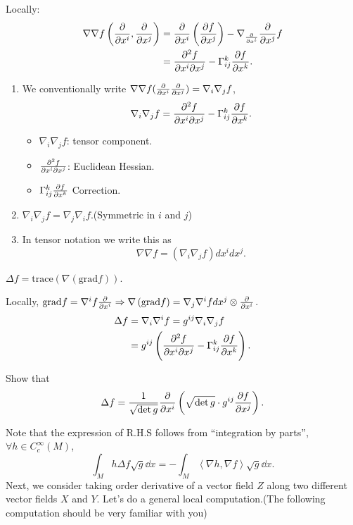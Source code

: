  Locally: 
 \begin{align*}
    \nabla\nabla f\left(\pdv{x^i},\pdv{x^j}\right)&=
    \pdv{x^i}\left(\pdv{f}{x^j}\right)-\nabla_{\pdv{x^i}}\pdv{x^j} f\\
    &=\pdv{f}{x^i}{x^j}-\Gamma\indices*{_{ij}^k}\pdv{f}{x^k}.
 \end{align*}
 \begin{remark}
    \begin{enumerate}[(1)]
        \item We conventionally write \(\nabla\nabla f(\pdv{x^i}
        \pdv{x^j})=\nabla_i\nabla_j f\), \ie\ 
        \[
            \nabla_i\nabla_j f=
            \pdv{f}{x^i}{x^j}-\Gamma\indices*{_{ij}^k}\pdv{f}{x^k}.   
        \]
        \begin{itemize}
            \item \(\nabla_i\nabla_j f\): tensor component.
            \item \(\pdv{f}{x^i}{x^j}\): Euclidean Hessian.
            \item \(\Gamma\indices*{_{ij}^k}\pdv{f}{x^k}\)
            Correction.
        \end{itemize}
        \item \(\nabla_i\nabla_j f=\nabla_j\nabla_i f\).(Symmetric in 
        \(i\) and \(j\))
        \item In tensor notation we write this as 
        \[
            \nabla\nabla f=\left(\nabla_i\nabla_j f\right)d x^i d x^j.    
        \]
    \end{enumerate}
 \end{remark}
 \begin{definition}[Laplacian of \(f\)]
    \(\Delta f=\mathrm{trace}\left(\nabla\left(\mathrm{grad}
    f\right)\right)\).
 \end{definition}
 Locally, \(\mathrm{grad} f=\nabla^i f\pdv{x^i}\Rightarrow
 \nabla\left(\mathrm{grad}f\right)=\nabla_j\nabla^i f dx^j\otimes
  \pdv{x^i}\).
  \begin{align*}
    \Delta f & =\nabla_i \nabla^i f=g^{ij}\nabla_i\nabla_j f\\
    &=g^{ij}\left(
        \pdv{f}{x^i}{x^j}-\Gamma\indices*{_{ij}^k}\pdv{f}{x^k}
    \right).
  \end{align*}
  \begin{exercise}
    Show that 
    \[
        \Delta f=\frac{1}{\sqrt{\det g}}\pdv{x^i}\left(
            \sqrt{\det g}\cdot g^{ij}\pdv{f}{x^j}
        \right)    .
    \]
  \end{exercise}
  Note that the expression of R.H.S follows from
  ``integration by parts'', \ie\ \(\forall h\in C^\infty_c(M)\),
  \[
    \int_M  h\Delta f \sqrt{g}\dd x =-\int_M \left\langle
        \nabla h,\nabla f
    \right\rangle\sqrt{g}\dd x.
  \]
  Next, we consider taking  order derivative
  of a vector field \(Z\) along two different vector fields \(X\) and 
  \(Y\). Let's do a general local computation.(The following 
  computation should be very familiar with you)

